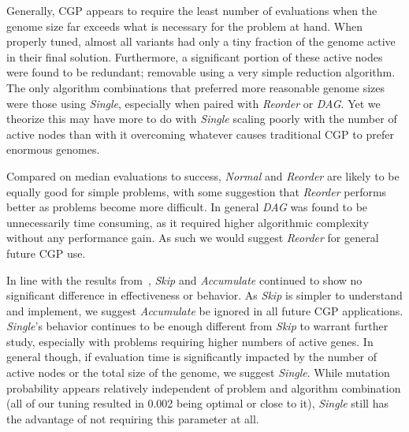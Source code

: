\documentclass[journal]{IEEEtran}
\begin{document}
Generally, CGP appears to require the least number of evaluations when the genome
size far exceeds what is necessary for the problem at hand.  When properly tuned,
almost all variants had only a tiny fraction of the genome active in their final
solution.  Furthermore, a significant portion of these active nodes were found
to be redundant; removable using a very simple reduction algorithm.  The only
algorithm combinations that preferred more reasonable genome sizes were those using \emph{Single},
especially when paired with \emph{Reorder} or \emph{DAG}.  Yet we theorize this may
have more to do with \emph{Single} scaling poorly with the number of active nodes
than with it overcoming whatever causes traditional CGP to prefer enormous genomes.

Compared on median evaluations to success, \emph{Normal} and \emph{Reorder} are
likely to be equally good for simple problems, with some suggestion that \emph{Reorder}
performs better as problems become more difficult.  In general \emph{DAG} was found
to be unnecessarily time consuming, as it required higher algorithmic complexity
without any performance gain.  As such we would suggest \emph{Reorder} for general
future CGP use.

In line with the results from~\cite{goldman:2013:cgpwaste}, \emph{Skip} and
\emph{Accumulate} continued to show no significant difference in effectiveness
or behavior.  As \emph{Skip} is simpler to understand and implement, we suggest
\emph{Accumulate} be ignored in all future CGP applications.  \emph{Single}'s
behavior continues to be enough different from \emph{Skip} to warrant further
study, especially with problems requiring higher numbers of active genes.  In
general though, if evaluation time is significantly impacted by the number of
active nodes or the total size of the genome, we suggest \emph{Single}.  While
mutation probability appears relatively independent of problem and algorithm combination (all of our tuning
resulted in 0.002 being optimal or close to it), \emph{Single} still has the
advantage of not requiring this parameter at all.
\end{document}
